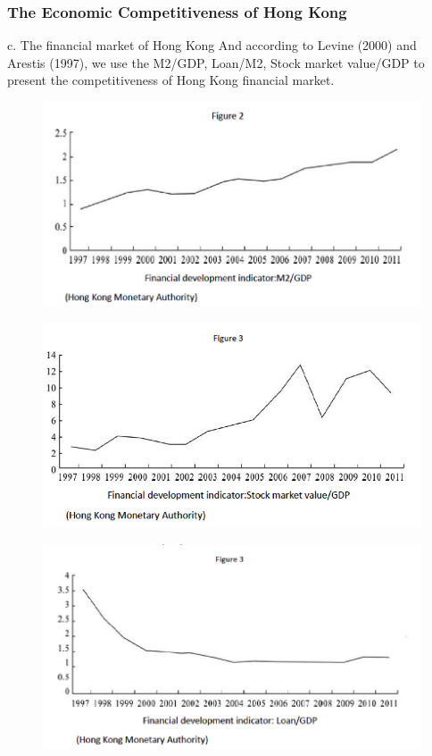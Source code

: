 \documentclass[slidestop,uncompress,mathsans, 12pt]{beamer}
\begin{document}
\begin{frame}
\frametitle{The Economic Competitiveness of Hong Kong}%
c. The financial market of Hong Kong
And according to Levine (2000) and Arestis (1997), we use the M2/GDP, Loan/M2, Stock market value/GDP to present the competitiveness of Hong Kong financial market.\\
\begin{overprint}
\begin{figure}[h]
\centering
\includegraphics[width=1\textwidth]{hk10.png}
\label{threadsVsSync}
\end{figure}
\begin{figure}[h]
\centering
\includegraphics[width=1\textwidth]{hk11.png}
\label{threadsVsSync}
\end{figure}
\begin{figure}[h]
\centering
\includegraphics[width=1\textwidth]{hk12.png}
\label{threadsVsSync}
\end{figure}
\end{overprint}
\end{frame}
\end{document}
